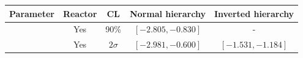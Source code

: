\begin{tabular}{| c | c | c | c | c |}
\hline
Parameter & Reactor & CL & Normal hierarchy & Inverted hierarchy \\
\hline
\deltacp		& Yes & 90\% & $\left[ -2.805, -0.830 \right]$ & - \\
\deltacp		& Yes & $ 2\sigma $ & $\left[ -2.981, -0.600 \right]$ & $\left[ -1.531, -1.184 \right]$ \\
\hline
\end{tabular}
